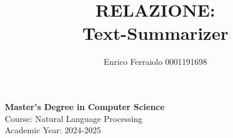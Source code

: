 \documentclass[a4paper, 12pt]{article}
\title{\textbf{RELAZIONE: \\ Text-Summarizer}}
\author{Enrico Ferraiolo 0001191698}
\date{}
\begin{document}
\maketitle

\begin{center}
    \textbf{Master's Degree in Computer Science}\\
    \vspace{0.3cm}
    Course: Natural Language Processing \\
    Academic Year: 2024-2025
    \vspace{2cm}
\end{center}

\newpage

\tableofcontents
\newpage










\newpage
\printbibliography
\end{document}
